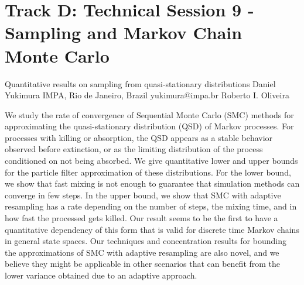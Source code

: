 \section{Track D: Technical Session 9 - Sampling and Markov Chain Monte Carlo}\newpage

\begin{talk}
  {Quantitative results on sampling from quasi-stationary distributions}%
  {Daniel Yukimura}%
  {IMPA, Rio de Janeiro, Brazil}%
  {yukimura@impa.br}%
  {Roberto I. Oliveira}%
  
    
   
    We study the rate of convergence of Sequential Monte Carlo (SMC) methods for approximating the quasi-stationary distribution (QSD) of Markov processes. 
    For processes with killing or absorption, the QSD appears as a stable behavior observed before extinction, or as the limiting distribution of the process conditioned on not being absorbed. 
    We give quantitative lower and upper bounds for the particle filter approximation of these distributions.
    For the lower bound, we show that fast mixing is not enough to guarantee that simulation methods can converge in few steps.
    In the upper bound, we show that SMC with adaptive resampling has a rate depending on the number of steps, the mixing time, and in how fast the processed gets killed.
    Our result seems to be the first to have a quantitative dependency of this form that is valid for discrete time Markov chains in general state spaces.
    Our techniques and concentration results for bounding the approximations of SMC with adaptive resampling are also novel, and we believe they might be applicable in other scenarios that can benefit from the lower variance obtained due to an adaptive approach.
    
    

\medskip


\end{talk}

